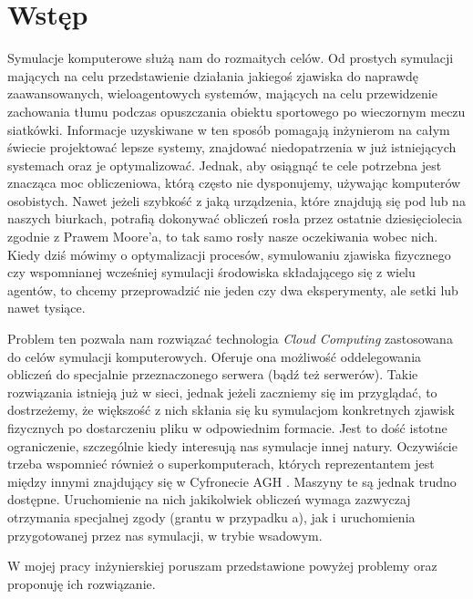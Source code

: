 \chapter{Wstęp}
\label{cha:wstep}

\par Symulacje komputerowe służą nam do rozmaitych celów. Od prostych symulacji mających na celu przedstawienie działania jakiegoś zjawiska do naprawdę zaawansowanych, wieloagentowych systemów, mających na celu przewidzenie zachowania tłumu podczas opuszczania obiektu sportowego po wieczornym meczu siatkówki. Informacje uzyskiwane w ten sposób pomagają inżynierom na całym świecie projektować lepsze systemy, znajdować niedopatrzenia w już istniejących systemach oraz je optymalizować. Jednak, aby osiągnąć te cele potrzebna jest znacząca moc obliczeniowa, którą często nie dysponujemy, używając komputerów osobistych. Nawet jeżeli szybkość z jaką urządzenia, które znajdują się pod lub na naszych biurkach, potrafią dokonywać obliczeń rosła przez ostatnie dziesięciolecia zgodnie z Prawem Moore'a\cite{mollick2006establishing}, to tak samo rosły nasze oczekiwania wobec nich. Kiedy dziś mówimy o optymalizacji procesów, symulowaniu zjawiska fizycznego czy wspomnianej wcześniej symulacji środowiska składającego się z wielu agentów, to chcemy przeprowadzić nie jeden czy dwa eksperymenty, ale setki lub nawet tysiące.

\par Problem ten pozwala nam rozwiązać technologia \emph{Cloud Computing} zastosowana do celów symulacji komputerowych. Oferuje ona możliwość oddelegowania obliczeń do specjalnie przeznaczonego serwera (bądź też serwerów). Takie rozwiązania istnieją już w sieci, jednak jeżeli zaczniemy się im przyglądać, to dostrzeżemy, że większość z nich skłania się ku symulacjom konkretnych zjawisk fizycznych po dostarczeniu pliku w odpowiednim formacie. Jest to dość istotne ograniczenie, szczególnie kiedy interesują nas symulacje innej natury. Oczywiście trzeba wspomnieć również o superkomputerach, których reprezentantem jest między innymi znajdujący się w Cyfronecie AGH \emph{\prometheusAgh{}}. Maszyny te są jednak trudno dostępne. Uruchomienie na nich jakikolwiek obliczeń wymaga zazwyczaj otrzymania specjalnej zgody (grantu w przypadku \emph{\prometheusAgh{}}a), jak i uruchomienia przygotowanej przez nas symulacji, w trybie wsadowym.

\par W mojej pracy inżynierskiej poruszam przedstawione powyżej problemy oraz proponuję ich rozwiązanie.

